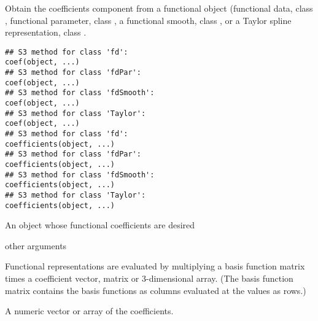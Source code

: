 \begin{Description}\relax
Obtain the coefficients component from a functional object (functional
data, class , functional parameter, class , a
functional smooth, class , or a Taylor spline
representation, class .
\end{Description}
\begin{Usage}
\begin{verbatim}
## S3 method for class 'fd':
coef(object, ...)
## S3 method for class 'fdPar':
coef(object, ...)
## S3 method for class 'fdSmooth':
coef(object, ...)
## S3 method for class 'Taylor':
coef(object, ...)
## S3 method for class 'fd':
coefficients(object, ...)
## S3 method for class 'fdPar':
coefficients(object, ...)
## S3 method for class 'fdSmooth':
coefficients(object, ...)
## S3 method for class 'Taylor':
coefficients(object, ...)
\end{verbatim}
\end{Usage}
\begin{Arguments}
\begin{ldescription}
\item[\code{object}] An object whose functional coefficients are desired 

\item[\code{... }] other arguments 

\end{ldescription}
\end{Arguments}
\begin{Details}\relax
Functional representations are evaluated by multiplying a basis
function matrix times a coefficient vector, matrix or 3-dimensional
array. (The basis function matrix contains the basis functions as
columns evaluated at the  values as rows.)
\end{Details}
\begin{Value}
A numeric vector or array of the coefficients.
\end{Value}
\begin{SeeAlso}\relax
{}
\end{SeeAlso}
